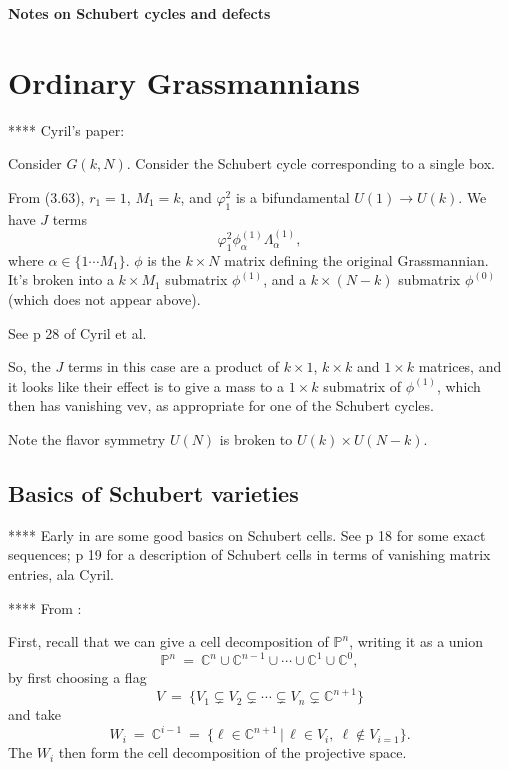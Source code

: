\documentclass[12pt]{article}
\begin{document}
\vspace*{0.5in}

\begin{center}

{\large\bf Notes on Schubert cycles and defects}

\end{center}


\section{Ordinary Grassmannians}

**** Cyril's paper:  \cite{Closset:2023bdr}


Consider $G(k,N)$.  Consider the Schubert cycle corresponding to a single
box.

From (3.63), $r_1 = 1$, $M_1 = k$, and $\varphi_1^2$ is a bifundamental
$U(1) \rightarrow U(k)$.  We have $J$ terms
\begin{equation}
\varphi_1^2 \phi^{(1)}_{\alpha} \Lambda^{(1)}_{\alpha},
\end{equation}
where $\alpha \in \{1 \cdots M_1\}$.
$\phi$ is the $k \times N$ matrix defining the original Grassmannian.
It's broken into a $k \times M_1$ submatrix $\phi^{(1)}$,
and a $k \times (N-k)$ submatrix $\phi^{(0)}$ (which does not appear above).

See p 28 of Cyril et al.

So, the $J$ terms in this case are a product of $k \times 1$, $k \times k$
and $1 \times k$ matrices, and it looks like their effect is to give a mass
to a $1 \times k$ submatrix of $\phi^{(1)}$, which then has vanishing vev,
as appropriate for one of the Schubert cycles.

Note the flavor symmetry $U(N)$ is broken to $U(k) \times U(N-k)$.



\subsection{Basics of Schubert varieties}

**** Early in \cite{fp} are some good basics on Schubert cells.
See p 18 for some exact sequences; p 19 for a description of Schubert
cells in terms of vanishing matrix entries, ala Cyril.


**** From \cite[chapter 1.5]{gh}:

First, recall that we can give a cell decomposition of ${\mathbb P}^n$,
writing it as a union 
\begin{equation}
{\mathbb P}^n \: = \: {\mathbb C}^n \cup {\mathbb C}^{n-1} \cup
\cdots \cup {\mathbb C}^1 \cup {\mathbb C}^0,
\end{equation}
by first choosing a flag
\begin{equation}
V \: = \: \{ V_1 \subsetneq V_2 \subsetneq \cdots \subsetneq V_n 
\subsetneq {\mathbb C}^{n+1} \}
\end{equation}
and take 
\begin{equation}
W_i \: = \: {\mathbb C}^{i-1} \: = \: \{
\ell \in {\mathbb C}^{n+1} \, | \,
\ell \in V_i, \: \ell \not\in V_{i=1} \}.
\end{equation}
The $W_i$ then form the cell decomposition of the projective space.
\end{document}
